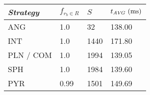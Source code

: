 
\begin{tabular}{m{}|m{}|m{}|m{}}
    \toprule
    \textit{Strategy} & $f_{r_b \in R}$ & $S$ & $t_{\AVG} \ (\si{ms})$  \\ \hline
    ANG & \num{1.0} & \num{32} & \num{138.00} \\ \hline
    INT & \num{1.0} & \num{1440} & \num{171.80} \\ \hline
    PLN / COM & \num{1.0} & \num{1994} & \num{139.05} \\ \hline
    SPH & \num{1.0} & \num{1984} & \num{139.60} \\ \hline
    PYR & \num{0.99} & \num{1501} & \num{149.69} \\ \bottomrule
\end{tabular}